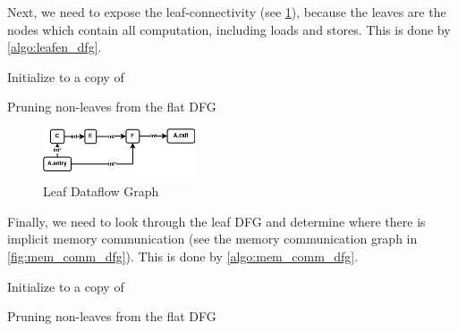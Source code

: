 Next, we need to expose the leaf-connectivity (see \cref{fig:leaf_dfg}), because the leaves are the nodes which contain all computation, including loads and stores. This is done by \cref{algo:leafen_dfg}.

\begin{algorithm}[h]
{}


Initialize \ldfg to a copy of \fdfg\;
\caption{Pruning non-leaves from the flat DFG}
\label{algo:leafen_dfg}
\end{algorithm}

\begin{figure}[h]
    \centering
    \includegraphics[width=0.4\textwidth]{leaf_dfg.png}
    \caption{Leaf Dataflow Graph}
    \label{fig:leaf_dfg}
\end{figure}

Finally, we need to look through the leaf DFG and determine where there is implicit memory communication (see the memory communication graph in \cref{fig:mem_comm_dfg}). This is done by \cref{algo:mem_comm_dfg}.

\begin{algorithm}[h]
{}



Initialize \ldfg to a copy of \mcdfg\;
\caption{Pruning non-leaves from the flat DFG}
\label{algo:mem_comm_dfg}
\end{algorithm}

